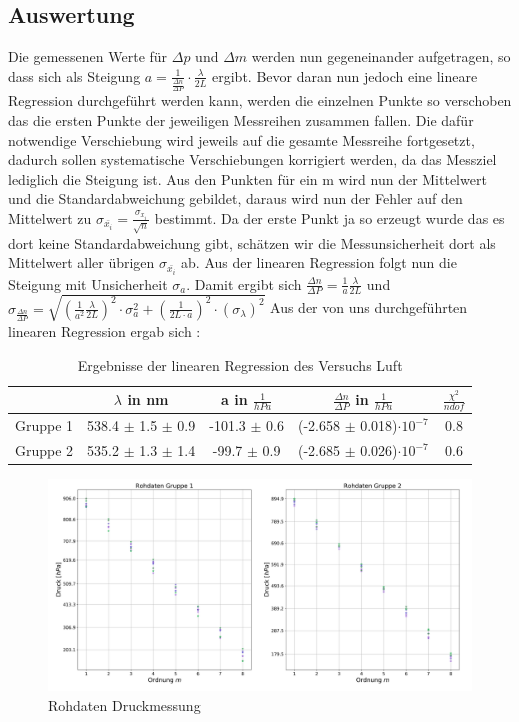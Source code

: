 \documentclass[a4paper, 11pt]{article}
\begin{document}
\subsection{Auswertung}
Die gemessenen Werte für $\Delta p$ und $\Delta m$ werden nun gegeneinander aufgetragen, so dass sich als Steigung $a=\frac{1}{\frac{\Delta n}{\Delta P}} \cdot \frac{\lambda}{2L}$ ergibt. Bevor daran nun jedoch eine lineare Regression durchgeführt werden kann,  werden die einzelnen Punkte so verschoben das die ersten Punkte der jeweiligen Messreihen zusammen fallen. Die dafür notwendige Verschiebung wird jeweils auf die gesamte Messreihe fortgesetzt, dadurch sollen systematische Verschiebungen korrigiert werden, da das Messziel lediglich die Steigung ist. Aus den Punkten für ein m wird nun der Mittelwert und die Standardabweichung gebildet, daraus wird nun der Fehler auf den Mittelwert zu $\sigma_{\bar{x_i}}=\frac{\sigma_{x_i}}{\sqrt{n}}$ bestimmt. Da der erste Punkt ja so erzeugt wurde das es dort keine Standardabweichung gibt, schätzen wir die Messunsicherheit dort als Mittelwert aller übrigen $\sigma_{\bar{x_i}}$ ab. Aus der linearen Regression folgt nun die Steigung mit Unsicherheit $\sigma_a$. Damit ergibt sich 
\newline
$\frac{\Delta n}{\Delta P}=\frac{1}{a}\frac{\lambda}{2L}$ 
\newline
und
$\sigma_{\frac{\Delta n}{\Delta P}}=\sqrt{(\frac{1}{a^2} \frac{\lambda}{2L})^2 \cdot \sigma_a^2 + (\frac{1}{2L \cdot a})^2 \cdot (\sigma_{\lambda})^2} $
\newline
Aus der von uns durchgeführten linearen Regression ergab sich :
\begin{table}[H]
	\large
	\centering
	\begin{tabular}{|c|c|c|c|c|}
		\hline  $\ $ & $\lambda$ in nm		&	a in $\frac{1}{hPa}$	&	$\frac{\Delta n}{\Delta P}$ in $\frac{1}{hPa}$	& $\frac{\chi^2}{ndof}$\\
		\hline	Gruppe 1 & 538.4 $\pm$ 1.5 $\pm$	0.9	& -101.3 $\pm$ 0.6		&(-2.658 $\pm$ 0.018)$\cdot 10^{-7}$&0.8	  \\
		\hline  Gruppe 2 & 535.2 $\pm$ 1.3 $\pm$	1.4	& -99.7 $\pm $ 0.9	&(-2.685 $\pm$ 0.026)$\cdot 10^{-7}$	&0.6	\\
		\hline
	\end{tabular}
	\caption{Ergebnisse der linearen Regression des Versuchs Luft}
	\label{table:lin_reg_Luft}
\end{table}
\begin{figure}[H]
	\hskip-2cm
	\includegraphics[scale=0.35]{./Bilder/Rohdaten.png}
	\caption{Rohdaten Druckmessung}
	\label{pic:Druckmessung}	
\end{figure}
\end{document}
